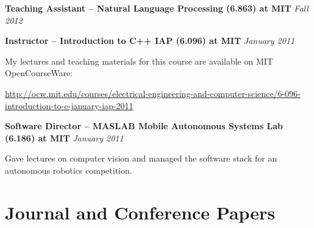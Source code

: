 \documentclass[margin,line]{resume}
\begin{document}
\begin{resume}
\vspace{-8mm}

\textbf{Teaching Assistant -- Natural Language Processing (6.863) at MIT} \hfill \textsl{Fall 2012} \\

\vspace{-8mm}

\textbf{Instructor -- Introduction to C++ IAP (6.096) at MIT} \hfill \textsl{January 2011}\\

\vspace{-8mm}

My lectures and teaching materials for this course are available on MIT OpenCourseWare:\\

\vspace{-8mm}

\url{http://ocw.mit.edu/courses/electrical-engineering-and-computer-science/6-096-introduction-to-c-january-iap-2011} \\

\vspace{-7mm}

\textbf{Software Director -- MASLAB Mobile Autonomous Systems Lab (6.186) at MIT} \hfill \textsl{January 2011}\\

\vspace{-8mm}

Gave lectures on computer vision and managed the software stack for an autonomous robotics competition.

\section{\mysidestyle Journal and Conference Papers}



\end{resume}
\end{document}
